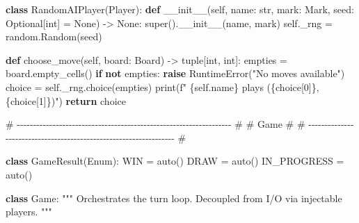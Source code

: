 \documentclass[11pt]{article}
\newenvironment{Shaded}{\begin{snugshade}}{\end{snugshade}}
\newcommand{\BuiltInTok}[1]{\textcolor[rgb]{0.50,0.55,0.55}{#1}}
\newcommand{\CommentTok}[1]{\textcolor[rgb]{0.48,0.49,0.49}{#1}}
\newcommand{\ControlFlowTok}[1]{\textcolor[rgb]{0.99,0.74,0.29}{\textbf{#1}}}
\newcommand{\DecValTok}[1]{\textcolor[rgb]{0.96,0.45,0.00}{#1}}
\newcommand{\FunctionTok}[1]{\textcolor[rgb]{0.56,0.27,0.68}{#1}}
\newcommand{\KeywordTok}[1]{\textcolor[rgb]{0.81,0.81,0.76}{\textbf{#1}}}
\newcommand{\NormalTok}[1]{\textcolor[rgb]{0.81,0.81,0.76}{#1}}
\newcommand{\OperatorTok}[1]{\textcolor[rgb]{0.81,0.81,0.76}{#1}}
\newcommand{\PreprocessorTok}[1]{\textcolor[rgb]{0.15,0.68,0.38}{#1}}
\newcommand{\SpecialCharTok}[1]{\textcolor[rgb]{0.24,0.68,0.91}{#1}}
\newcommand{\SpecialStringTok}[1]{\textcolor[rgb]{0.85,0.27,0.33}{#1}}
\newcommand{\StringTok}[1]{\textcolor[rgb]{0.96,0.31,0.31}{#1}}
\newcommand{\VariableTok}[1]{\textcolor[rgb]{0.15,0.68,0.68}{#1}}
\begin{document}
\begin{Shaded}
\begin{Highlighting}[]
\KeywordTok{class}\NormalTok{ RandomAIPlayer(Player):}
    \KeywordTok{def} \FunctionTok{\_\_init\_\_}\NormalTok{(}\VariableTok{self}\NormalTok{, name: }\BuiltInTok{str}\NormalTok{, mark: Mark, seed: Optional[}\BuiltInTok{int}\NormalTok{] }\OperatorTok{=} \VariableTok{None}\NormalTok{) }\OperatorTok{{-}\textgreater{}} \VariableTok{None}\NormalTok{:}
        \BuiltInTok{super}\NormalTok{().}\FunctionTok{\_\_init\_\_}\NormalTok{(name, mark)}
        \VariableTok{self}\NormalTok{.\_rng }\OperatorTok{=}\NormalTok{ random.Random(seed)}

    \KeywordTok{def}\NormalTok{ choose\_move(}\VariableTok{self}\NormalTok{, board: Board) }\OperatorTok{{-}\textgreater{}} \BuiltInTok{tuple}\NormalTok{[}\BuiltInTok{int}\NormalTok{, }\BuiltInTok{int}\NormalTok{]:}
\NormalTok{        empties }\OperatorTok{=}\NormalTok{ board.empty\_cells()}
        \ControlFlowTok{if} \KeywordTok{not}\NormalTok{ empties:}
            \ControlFlowTok{raise} \PreprocessorTok{RuntimeError}\NormalTok{(}\StringTok{"No moves available"}\NormalTok{)}
\NormalTok{        choice }\OperatorTok{=} \VariableTok{self}\NormalTok{.\_rng.choice(empties)}
        \BuiltInTok{print}\NormalTok{(}\SpecialStringTok{f"  }\SpecialCharTok{\{}\VariableTok{self}\SpecialCharTok{.}\NormalTok{name}\SpecialCharTok{\}}\SpecialStringTok{ plays (}\SpecialCharTok{\{}\NormalTok{choice[}\DecValTok{0}\NormalTok{]}\SpecialCharTok{\}}\SpecialStringTok{,}\SpecialCharTok{\{}\NormalTok{choice[}\DecValTok{1}\NormalTok{]}\SpecialCharTok{\}}\SpecialStringTok{)"}\NormalTok{)}
        \ControlFlowTok{return}\NormalTok{ choice}


\CommentTok{\# {-}{-}{-}{-}{-}{-}{-}{-}{-}{-}{-}{-}{-}{-}{-}{-}{-}{-}{-}{-}{-}{-}{-}{-}{-}{-}{-}{-}{-}{-}{-}{-}{-}{-}{-}{-}{-}{-}{-}{-}{-}{-}{-}{-}{-}{-}{-}{-}{-}{-}{-}{-}{-}{-}{-}{-}{-}{-}{-}{-}{-}{-}{-}{-}{-}{-} \#}
\CommentTok{\# Game                                                                \#}
\CommentTok{\# {-}{-}{-}{-}{-}{-}{-}{-}{-}{-}{-}{-}{-}{-}{-}{-}{-}{-}{-}{-}{-}{-}{-}{-}{-}{-}{-}{-}{-}{-}{-}{-}{-}{-}{-}{-}{-}{-}{-}{-}{-}{-}{-}{-}{-}{-}{-}{-}{-}{-}{-}{-}{-}{-}{-}{-}{-}{-}{-}{-}{-}{-}{-}{-}{-}{-} \#}

\KeywordTok{class}\NormalTok{ GameResult(Enum):}
\NormalTok{    WIN }\OperatorTok{=}\NormalTok{ auto()}
\NormalTok{    DRAW }\OperatorTok{=}\NormalTok{ auto()}
\NormalTok{    IN\_PROGRESS }\OperatorTok{=}\NormalTok{ auto()}


\KeywordTok{class}\NormalTok{ Game:}
    \CommentTok{"""}
\CommentTok{    Orchestrates the turn loop.}
\CommentTok{    Decoupled from I/O via injectable players.}
\CommentTok{    """}


\end{Highlighting}
\end{Shaded}
\end{document}
